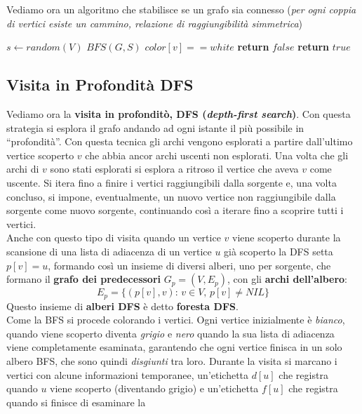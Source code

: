 \documentclass[a4paper,12pt, oneside]{book}
\begin{document}
Vediamo ora un algoritmo che stabilisce se un grafo sia connesso
(\textit{per ogni coppia di vertici esiste un cammino, relazione di
  raggiungibilità simmetrica})
\begin{algorithm}
  \begin{algorithmic}
    \State $s\gets random(V)$
    \State $BFS(G, S)$
    \If $color[v]==white$
    \State \textbf{return }$false$
    \Else
    \State \textbf{return }$true$
    \EndIf
    \EndFor
    \EndFunction
  \end{algorithmic}
\end{algorithm}
\subsection{Visita in Profondità DFS}
Vediamo ora la \textbf{visita in profonditò, DFS (\textit{depth-first
    search})}. Con questa strategia si esplora il grafo andando ad
ogni istante il più possibile in ``profondità''. Con questa tecnica
gli archi vengono esplorati a partire dall'ultimo vertice scoperto $v$
che abbia ancor archi uscenti non esplorati. Una volta che gli archi
di $v$ sono stati esplorati si esplora a ritroso il vertice che aveva
$v$ come uscente. Si itera fino a finire i vertici raggiungibili dalla
sorgente e, una volta concluso, si impone, eventualmente, un nuovo
vertice non raggiungibile dalla sorgente come nuovo sorgente,
continuando così a iterare fino a scoprire tutti i vertici. \\
Anche con questo tipo di visita quando un vertice $v$ viene scoperto
durante la scansione di una lista di adiacenza di un vertice $u$ già
scoperto la DFS setta $p[v]=u$, formando così un insieme di diversi
alberi, uno per sorgente, che formano il \textbf{grafo dei
  predecessori} $G_p=(V,E_p)$, con gli \textbf{archi dell'albero}:
\[E_p=\{(p[v],v):\,v\in V,\, p[v]\neq NIL\}\]
Questo insieme di \textbf{alberi DFS} è detto \textbf{foresta DFS}.\\
Come la BFS si procede colorando i vertici. Ogni vertice inizialmente
è \textit{bianco}, quando viene scoperto diventa \textit{grigio} e
\textit{nero} quando la sua lista di adiacenza viene completamente
esaminata, garantendo che ogni vertice finisca in un solo albero BFS,
che sono quindi \textit{disgiunti} tra loro. Durante la visita si
marcano i vertici con alcune informazioni temporanee, un'etichetta
$d[u]$ che registra quando $u$ viene scoperto (diventando grigio) e
un'etichetta $f[u]$ che registra quando si finisce di esaminare la
\end{document}
